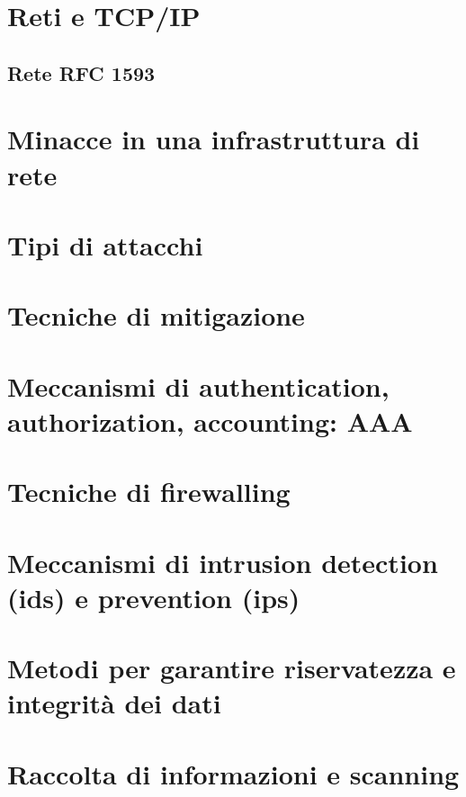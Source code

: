 \appendix

\chapter{Reti e TCP/IP} %
\section{Rete RFC 1593}

\chapter{Minacce in una infrastruttura di rete}  %

\chapter{Tipi di attacchi}  %

\chapter{Tecniche di mitigazione}  %

\chapter{Meccanismi di authentication, authorization, accounting: AAA}  %

\chapter{Tecniche di firewalling}                                       %

\chapter{Meccanismi di intrusion detection (ids) e prevention (ips)}	%
 
\chapter{Metodi per garantire riservatezza e integrità dei dati} 		%
  
\chapter{Raccolta di informazioni e scanning} 							%
   
